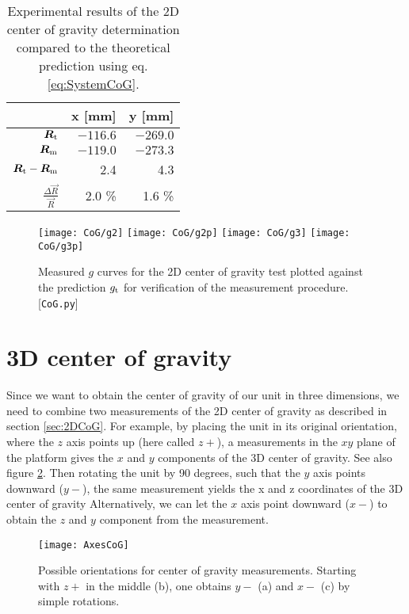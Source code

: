 \documentclass[journal]{IEEEtran}
\begin{document}
\begin{table}[t]
	\centering
	\begin{tabular}{r | r r}
		& x [mm] & y [mm] \\
		\hline
		$\vec{R}_{\textup{t}}$	&	$-116.6$	& $-269.0$ \\
		$\vec{R}_{\textup{m}}$	&	$-119.0$	& $-273.3$ \\
		$\vec{R}_{\textup{t}} - \vec{R}_{\textup{m}}$			&	2.4		& 4.3	\\
		$\frac{\Delta \vec{R}}{\vec{R}}$ &	2.0	\%	& 1.6 \% \\
	\end{tabular}
	\caption{Experimental results of the 2D center of gravity determination compared to the theoretical prediction using eq. \eqref{eq:SystemCoG}.}
	\label{tab:3MassResults}
\end{table}

\begin{figure}
	\centering
	\texttt{[image: CoG/g2]}
	\texttt{[image: CoG/g2p]}
	\texttt{[image: CoG/g3]}
	\texttt{[image: CoG/g3p]}
	\caption{Measured $g$ curves for the 2D center of gravity test plotted against the prediction $g_{\textup{t}}$ for verification of the measurement procedure. [\texttt{CoG.py}]}
	\label{fig:3MassGTest}
\end{figure}

\section{3D center of gravity}

Since we want to obtain the center of gravity of our unit in three dimensions, we need to combine two measurements of the 2D center of gravity as described in section \ref{sec:2DCoG}.
For example, by placing the unit in its original orientation, where the $z$ axis points up (here called $z+$), a measurements in the $xy$ plane of the platform gives the $x$ and $y$ components of the 3D center of gravity. See also figure \ref{fig:AxesCoG}.
Then rotating the unit by 90 degrees, such that the $y$ axis points downward ($y-$), the same measurement yields the x and z coordinates of the 3D center of gravity
Alternatively, we can let the $x$ axis point downward ($x-$) to obtain the $z$ and $y$ component from the measurement.

\begin{figure}
	\centering
	\texttt{[image: AxesCoG]}
	\caption{Possible orientations for center of gravity measurements. Starting with $z+$ in the middle (b), one obtains $y-$ (a) and $x-$ (c) by simple rotations.}
	\label{fig:AxesCoG}
\end{figure}
\end{document}
